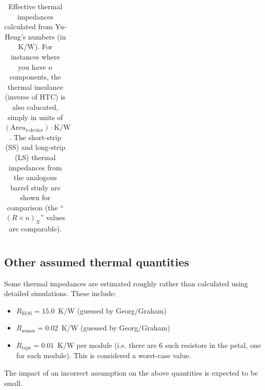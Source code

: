 \begin{table}[h]
\begin{center}
{\begin{tabular}{|l|cc|c|c|c|c|c|c|}
\hline \end{tabular}
} %
\end{center}
\caption{Effective thermal impedances calculated from Yu-Heng's numbers (in K/W).
For instances where you have $n$ components, the thermal insulance (inverse of HTC) is also calucated, simply
in units of {${(\text{Area}_\text{1-device})\cdot\text{K/W}}$}.
The short-strip (SS) and long-strip (LS) thermal impedances from the analogous barrel study are shown
for comparison (the ``$(R\times n)_X$'' values are comparable).
}
\label{tab:thermal_impedances}
\end{table}
\let\arraystretch\arraystretcha

\subsection{Other assumed thermal quantities}

Some thermal impedances are estimated roughly rather than calculated using detailed simulations.
These include:
%
\begin{itemize}
\item $R_\text{EOS}=15.0$~K/W (guessed by Georg/Graham)
\item $R_\text{sensor}=0.02$~K/W (guessed by Georg/Graham)
\item $R_\text{tape}=0.01$~K/W per module (i.e. there are 6 such resistors in the petal, one
for each module). This is considered a worst-case value.
\end{itemize}
%
The impact of an incorrect assumption on the above quantities is expected to be small.
